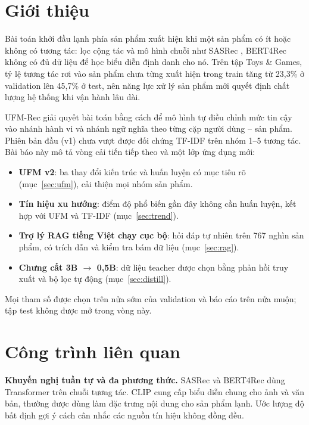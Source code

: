 \documentclass[conference,a4paper]{IEEEtran}
\begin{document}
\section{Giới thiệu}
Bài toán khởi đầu lạnh phía sản phẩm \cite{schein2002} xuất hiện khi một sản phẩm có ít hoặc không có tương tác: lọc cộng tác \cite{koren2009,rendle2009} và mô hình chuỗi như SASRec \cite{kang2018}, BERT4Rec \cite{sun2019} không có đủ dữ liệu để học biểu diễn định danh cho nó. Trên tập Toys \& Games, tỷ lệ tương tác rơi vào sản phẩm chưa từng xuất hiện trong train tăng từ 23,3\% ở validation lên 45,7\% ở test, nên năng lực xử lý sản phẩm mới quyết định chất lượng hệ thống khi vận hành lâu dài.

UFM-Rec giải quyết bài toán bằng cách để mô hình tự điều chỉnh mức tin cậy vào nhánh hành vi và nhánh ngữ nghĩa theo từng cặp người dùng -- sản phẩm. Phiên bản đầu (v1) chưa vượt được đối chứng TF-IDF trên nhóm 1--5 tương tác. Bài báo này mô tả vòng cải tiến tiếp theo và một lớp ứng dụng mới:
\begin{itemize}
  \item \textbf{UFM v2}: ba thay đổi kiến trúc và huấn luyện có mục tiêu rõ (mục~\ref{sec:ufm}), cải thiện mọi nhóm sản phẩm.
  \item \textbf{Tín hiệu xu hướng}: điểm độ phổ biến gần đây không cần huấn luyện, kết hợp với UFM và TF-IDF (mục~\ref{sec:trend}).
  \item \textbf{Trợ lý RAG tiếng Việt chạy cục bộ}: hỏi đáp tự nhiên trên 767 nghìn sản phẩm, có trích dẫn và kiểm tra bám dữ liệu (mục~\ref{sec:rag}).
  \item \textbf{Chưng cất 3B $\rightarrow$ 0,5B}: dữ liệu teacher được chọn bằng phản hồi truy xuất và bộ lọc tự động (mục~\ref{sec:distill}).
\end{itemize}
Mọi tham số được chọn trên nửa sớm của validation và báo cáo trên nửa muộn; tập test không được mở trong vòng này.

\section{Công trình liên quan}
\textbf{Khuyến nghị tuần tự và đa phương thức.} SASRec \cite{kang2018} và BERT4Rec \cite{sun2019} dùng Transformer \cite{vaswani2017} trên chuỗi tương tác. CLIP \cite{radford2021} cung cấp biểu diễn chung cho ảnh và văn bản, thường được dùng làm đặc trưng nội dung cho sản phẩm lạnh. Ước lượng độ bất định \cite{kendall2017} gợi ý cách cân nhắc các nguồn tín hiệu không đồng đều.
\end{document}
